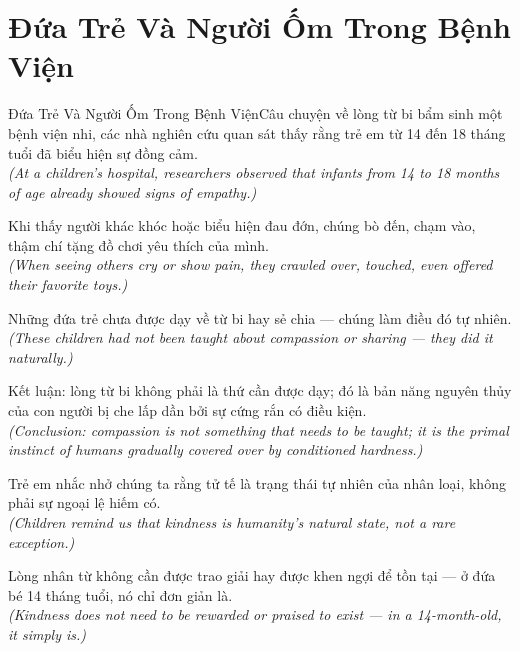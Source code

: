 \section{Đứa Trẻ Và Người Ốm Trong Bệnh Viện}
\begin{truyen}{Đứa Trẻ Và Người Ốm Trong Bệnh Viện}{Câu chuyện về lòng từ bi bẩm sinh}
 một bệnh viện nhi, các nhà nghiên cứu quan sát thấy rằng trẻ em từ 14 đến 18 tháng tuổi đã biểu hiện sự đồng cảm.\\[4pt]
\textit{(At a children's hospital, researchers observed that infants from 14 to 18 months of age already showed signs of empathy.)}

Khi thấy người khác khóc hoặc biểu hiện đau đớn, chúng bò đến, chạm vào, thậm chí tặng đồ chơi yêu thích của mình.\\[4pt]
\textit{(When seeing others cry or show pain, they crawled over, touched, even offered their favorite toys.)}

Những đứa trẻ chưa được dạy về từ bi hay sẻ chia --- chúng làm điều đó tự nhiên.\\[4pt]
\textit{(These children had not been taught about compassion or sharing --- they did it naturally.)}

Kết luận: lòng từ bi không phải là thứ cần được dạy; đó là bản năng nguyên thủy của con người bị che lấp dần bởi sự cứng rắn có điều kiện.\\[4pt]
\textit{(Conclusion: compassion is not something that needs to be taught; it is the primal instinct of humans gradually covered over by conditioned hardness.)}

Trẻ em nhắc nhở chúng ta rằng tử tế là trạng thái tự nhiên của nhân loại, không phải sự ngoại lệ hiếm có.\\[4pt]
\textit{(Children remind us that kindness is humanity's natural state, not a rare exception.)}

\end{truyen}
\begin{baihoc}
  Lòng nhân từ không cần được trao giải hay được khen ngợi để tồn tại --- ở đứa bé 14 tháng tuổi, nó chỉ đơn giản là.\\[4pt]
  \textit{(Kindness does not need to be rewarded or praised to exist --- in a 14-month-old, it simply is.)}
\end{baihoc}

